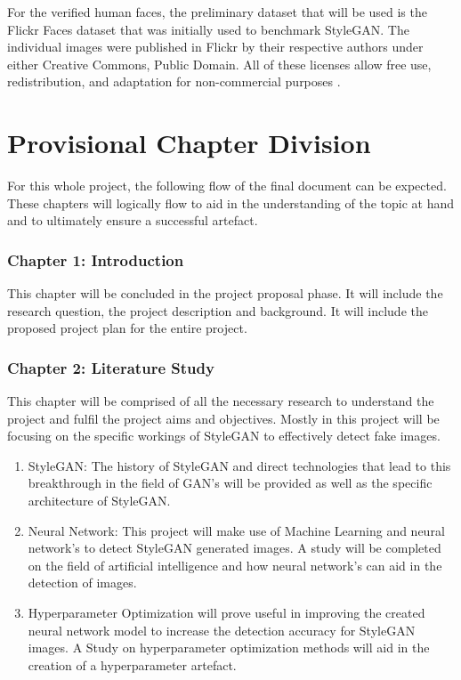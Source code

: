 For the verified human faces, the preliminary dataset that will be used is the Flickr Faces dataset that was initially used to benchmark StyleGAN. The individual images were published in Flickr by their respective authors under either Creative Commons, Public Domain. All of these licenses allow free use, redistribution, and adaptation for non-commercial purposes \citep{Karras2019}.

\section{Provisional Chapter Division}

For this whole project, the following flow of the final document can be expected. These chapters will logically flow to aid in the understanding of the topic at hand and to ultimately ensure a successful artefact.

\subsubsection*{Chapter 1: Introduction}
This chapter will be concluded in the project proposal phase. It will include the research question, the project description and background. It will include the proposed project plan for the entire project.

\subsubsection*{Chapter 2: Literature Study}
This chapter will be comprised of all the necessary research to understand the project and fulfil the project aims and objectives. Mostly in this project will be focusing on the specific workings of StyleGAN to effectively detect fake images.

\begin{enumerate}
    \item StyleGAN: The history of StyleGAN and direct technologies that lead to this breakthrough in the field of GAN’s will be provided as well as the specific architecture of StyleGAN.
    \item Neural Network: This project will make use of Machine Learning and neural network's to detect StyleGAN generated images. A study will be completed on the field of artificial intelligence and how neural network's can aid in the detection of images.
    \item Hyperparameter Optimization will prove useful in improving the created neural network model to increase the detection accuracy for StyleGAN images. A Study on hyperparameter optimization methods will aid in the creation of a hyperparameter artefact.
\end{enumerate}

